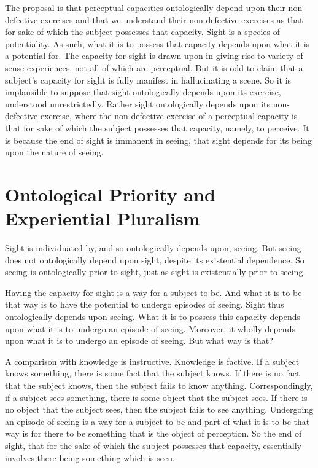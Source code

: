 \documentclass[12pt]{article}
\begin{document}
The proposal is that perceptual capacities ontologically depend upon their non-defective exercises and that we understand their non-defective exercises as that for sake of which the subject possesses that capacity. Sight is a species of potentiality. As such, what it is to possess that capacity depends upon what it is a potential for. The capacity for sight is drawn upon in giving rise to variety of sense experiences, not all of which are perceptual. But it is odd to claim that a subject's capacity for sight is fully manifest in hallucinating a scene. So it is implausible to suppose that sight ontologically depends upon its exercise, understood unrestrictedly. Rather sight ontologically depends upon its non-defective exercise, where the non-defective exercise of a perceptual capacity is that for sake of which the subject possesses that capacity, namely, to perceive. It is because the end of sight is immanent in seeing, that sight depends for its being upon the nature of seeing.


\section{Ontological Priority and Experiential Pluralism} %
\label{sec:ontological_dependence_and_experiential_pluralism}

Sight is individuated by, and so ontologically depends upon, seeing. But seeing does not ontologically depend upon sight, despite its existential dependence. So seeing is ontologically prior to sight, just as sight is existentially prior to seeing.

Having the capacity for sight is a way for a subject to be. And what it is to be that way is to have the potential to undergo episodes of seeing. Sight thus ontologically depends upon seeing. What it is to possess this capacity depends upon what it is to undergo an episode of seeing. Moreover, it wholly depends upon what it is to undergo an episode of seeing. But what way is that?

A comparison with knowledge is instructive. Knowledge is factive. If a subject knows something, there is some fact that the subject knows. If there is no fact that the subject knows, then the subject fails to know anything. Correspondingly, if a subject sees something, there is some object that the subject sees. If there is no object that the subject sees, then the subject fails to see anything. Undergoing an episode of seeing is a way for a subject to be and part of what it is to be that way is for there to be something that is the object of perception. So the end of sight, that for the sake of which the subject possesses that capacity, essentially involves there being something which is seen.



 
 
\end{document}
